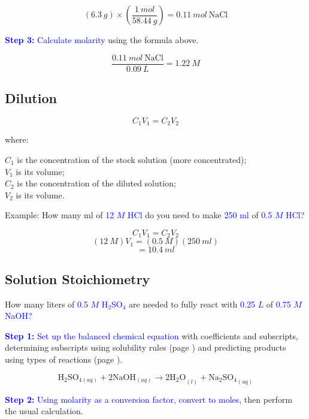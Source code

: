 \documentclass[a4paper, 12pt]{article}
\begin{document}
$$(6.3 \: g) \times \left(\frac{1 \: mol}{58.44 \: g}\right) = 0.11 \: mol \: \text{NaCl}$$

\textcolor{blue}{\textbf{Step 3:} Calculate molarity} using the formula above.

$$\frac{0.11 \: mol \: \text{NaCl}}{0.09 \: L} = 1.22 \: M$$


\subsection{Dilution}

$$C_1V_1 = C_2V_2$$

where:

$C_1$ is the concentration of the stock solution (more concentrated);\\
$V_1$ is its volume;\\
$C_2$ is the concentration of the diluted solution;\\
$V_2$ is its volume.

Example: How many ml of \textcolor{blue}{12 $M$ HCl} do you need to make \textcolor{blue}{250 ml} of \textcolor{blue}{0.5 $M$ HCl}?

$$C_1V_1 = C_2V_2$$
$$(12\: M)V_1 = (0.5 \: M)(250 \: ml)$$
$$ = \boxed{10.4 \: ml}$$

\subsection{Solution Stoichiometry}
How many liters of \textcolor{blue}{0.5 $M$ H$_2$SO$_4$} are needed to fully react with \textcolor{blue}{0.25 $L$} of \textcolor{blue}{0.75 $M$ NaOH?}

\textcolor{blue}{\textbf{Step 1:} Set up the balanced chemical equation} with coefficients and subscripts, determining subscripts using solubility rules (page \pageref{solubility rules}) and predicting products using types of reactions (page \pageref{types of reactions}).

$$\text{H}_2\text{SO}_{4(aq)} + 2\text{NaOH}_{(aq)} \longrightarrow 2\text{H$_2$O}_{(l)} + \text{Na$_2$SO$_4$}_{(aq)}$$

\textcolor{blue}{\textbf{Step 2:} Using molarity as a conversion factor, convert to moles}, then perform the usual calculation.
\end{document}
